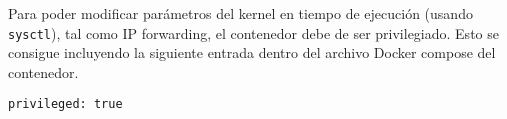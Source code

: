 Para poder modificar parámetros del kernel en tiempo de ejecución (usando  \texttt{sysctl}), tal como IP forwarding, el contenedor debe de ser privilegiado.
Esto se consigue incluyendo la siguiente entrada dentro del archivo Docker compose del contenedor.

\begin{lstlisting}
privileged: true
\end{lstlisting}


